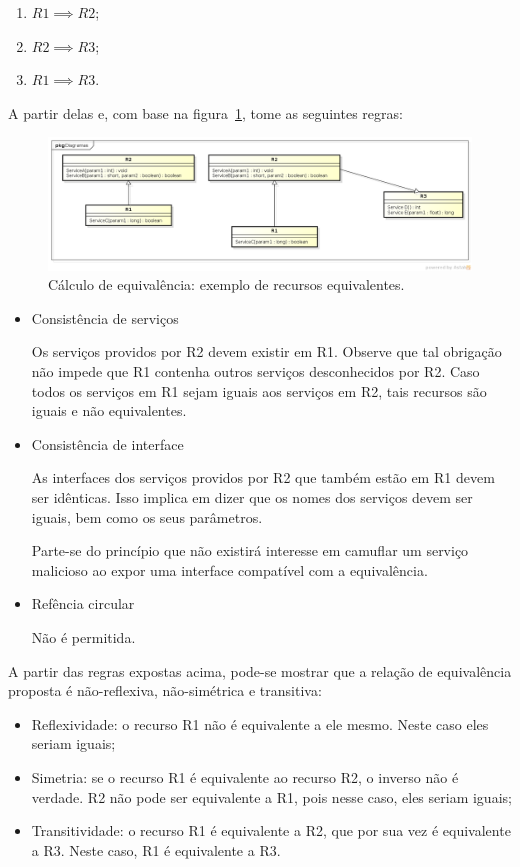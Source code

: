 \begin{enumerate}
	\item $R1 \implies R2$;
	\item $R2 \implies R3$;
	\item $R1 \implies R3$.
\end{enumerate}

A partir delas e, com base na figura~\ref{fig:calculoDeEquivalencia}, tome as seguintes regras:

\begin{figure}[ht]
	\center
	\includegraphics[scale=0.39]{imagens/calculoDeEquivalencia}
	\caption{Cálculo de equivalência: exemplo de recursos equivalentes.}
	\label{fig:calculoDeEquivalencia}
\end{figure}

\begin{itemize}
	\item Consistência de serviços

		Os serviços providos por R2 devem existir em R1. Observe que tal obrigação não impede que R1 contenha outros serviços desconhecidos por R2. Caso todos os serviços em R1 sejam iguais aos serviços em R2, tais recursos são iguais e não equivalentes.
	\item Consistência de interface

		As interfaces dos serviços providos por R2 que também estão em R1 devem ser idênticas. Isso implica em dizer que os nomes dos serviços devem ser iguais, bem como os seus parâmetros.

		Parte-se do princípio que não existirá interesse em camuflar um serviço malicioso ao expor uma interface compatível com a equivalência.
	\item Refência circular

		Não é permitida.
\end{itemize}

A partir das regras expostas acima, pode-se mostrar que a relação de equivalência proposta é não-reflexiva, não-simétrica e transitiva:

\begin{itemize}
	\item Reflexividade: o recurso R1 não é equivalente a ele mesmo. Neste caso eles seriam iguais;
	\item Simetria: se o recurso R1 é equivalente ao recurso R2, o inverso não é verdade. R2 não pode ser equivalente a R1, pois nesse caso, eles seriam iguais;
	\item Transitividade: o recurso R1 é equivalente a R2, que por sua vez é equivalente a R3. Neste caso, R1 é equivalente a R3.
\end{itemize}

